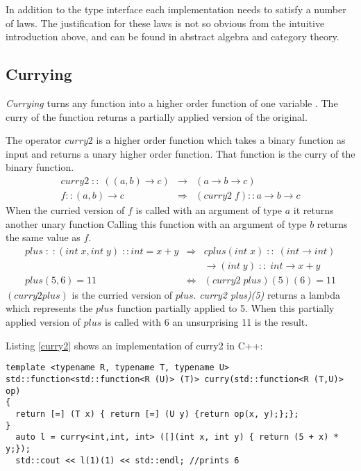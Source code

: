\documentclass[12pt,fleqn]{article}
\begin{document}
In addition to the type interface each implementation needs to satisfy a number of laws.
The justification for these laws is not so obvious from the intuitive introduction above, and can be found in abstract algebra and category theory.

%
%
%
\subsection{Currying}

%
%
{\em Currying} turns any function into a higher order function of one variable \cite{field}.
The curry of the function returns a partially applied version of the original.

The operator $curry2$ is a higher order function which takes a binary function as input 
and returns a unary higher order function.
That function is the curry of the binary function.
\begin{eqnarray*}
curry2 \; :: \; ((a,b) \rightarrow c) &\rightarrow& (a \rightarrow b \rightarrow c) \\
f::(a,b) \rightarrow c &\Rightarrow&  (curry2\;f)::a \rightarrow b \rightarrow c 
\end{eqnarray*}
When the curried version of $f$ is called with an argument of type $a$ it returns another unary function 
Calling this function with an argument of type $b$ returns the same value as $f$.
\begin{eqnarray*}
plus\;:\;:(int \;x, int \;y) \;::int = x+y &\Rightarrow& cplus(int\; x) \;::\; (int \rightarrow int)  \\
                                                             & & \rightarrow (int \; y) \;::\; int \rightarrow x+y  \\
plus(5,6) = 11 &\Leftrightarrow&(curry2 \; plus)(5)(6) = 11
\end{eqnarray*}
$(curry2 plus)$ is the curried version of $plus$.
{\em curry2 plus)(5)} returns a lambda which represents the $plus$ function partially applied to 5. 
When this partially applied version of $plus$ is called with 6 an unsurprising 11 is the result.

Listing \ref{curry2} shows an implementation of curry2 in C++: 


\begin{minipage}{\linewidth}
\begin{lstlisting}[caption=curry for binary operators, label=curry2]
template <typename R, typename T, typename U>
std::function<std::function<R (U)> (T)> curry(std::function<R (T,U)> op)
{
  return [=] (T x) { return [=] (U y) {return op(x, y);};};
}
  auto l = curry<int,int, int> ([](int x, int y) { return (5 + x) * y;});
  std::cout << l(1)(1) << std::endl; //prints 6
\end{lstlisting}
\end{minipage}
\end{document}
